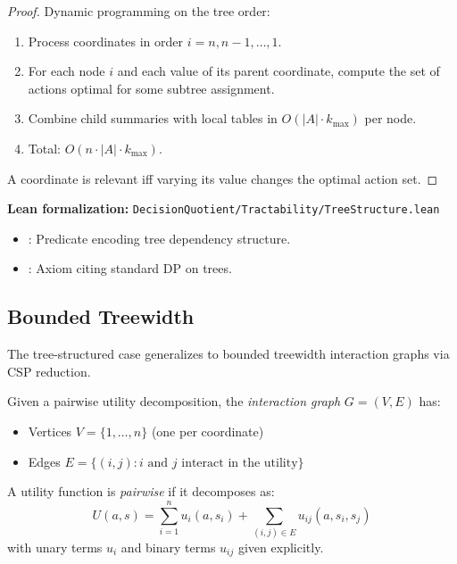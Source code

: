 \begin{proof}
Dynamic programming on the tree order:
\begin{enumerate}
\item Process coordinates in order $i = n, n-1, \ldots, 1$.
\item For each node $i$ and each value of its parent coordinate, compute the set of actions optimal for some subtree assignment.
\item Combine child summaries with local tables in $O(|A| \cdot k_{\max})$ per node.
\item Total: $O(n \cdot |A| \cdot k_{\max})$.
\end{enumerate}
A coordinate is relevant iff varying its value changes the optimal action set.
\end{proof}

\noindent\textbf{Lean formalization:} \texttt{DecisionQuotient/Tractability/TreeStructure.lean}
\begin{itemize}
\item {}: Predicate encoding tree dependency structure.
\item {}: Axiom citing standard DP on trees.
\end{itemize}

\subsection{Bounded Treewidth}\label{sec:tract-treewidth}

The tree-structured case generalizes to bounded treewidth interaction graphs via CSP reduction.

\begin{definition}\label{def:interaction-graph}
Given a pairwise utility decomposition, the \emph{interaction graph} $G = (V, E)$ has:
\begin{itemize}
\item Vertices $V = \{1, \ldots, n\}$ (one per coordinate)
\item Edges $E = \{(i, j) : i \text{ and } j \text{ interact in the utility}\}$
\end{itemize}
\end{definition}

\begin{definition}\label{def:pairwise}
A utility function is \emph{pairwise} if it decomposes as:
\[
U(a, s) = \sum_{i=1}^n u_i(a, s_i) + \sum_{(i,j) \in E} u_{ij}(a, s_i, s_j)
\]
with unary terms $u_i$ and binary terms $u_{ij}$ given explicitly.
\end{definition}

